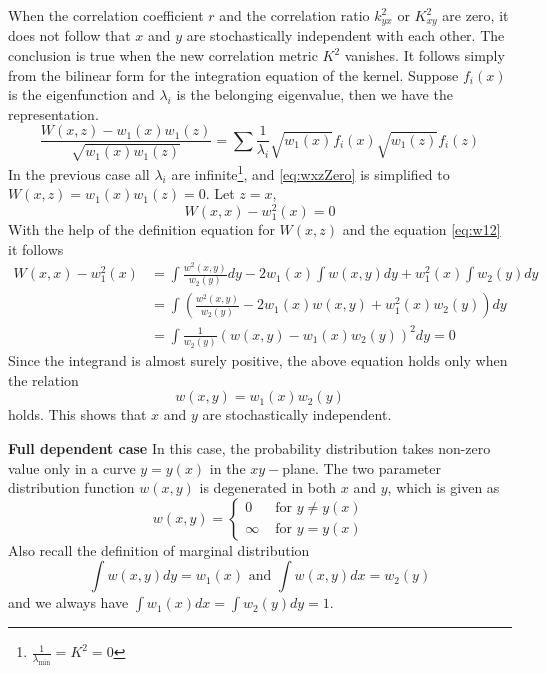 \documentclass{article}
\begin{document}
When the correlation coefficient $r$
and the correlation ratio $k^2_{yx}$ or $K^2_{xy}$
are zero, it does not follow that
$x$ and $y$ are stochastically independent with each other.
The conclusion is true when the new correlation metric $K^2$
vanishes. It follows simply from the bilinear form for the integration equation of the kernel. Suppose
$f_i(x)$ is the eigenfunction and $\lambda_i$
is the belonging eigenvalue,
then we have the representation.
\begin{equation}\label{eq:wxzZero}
    \frac{W(x,z) - w_1(x) w_1(z)}{\sqrt{w_1(x)w_1(z)}}
    = \sum \frac{1}{\lambda_i}
    \sqrt{w_1(x)}f_i(x) \sqrt{w_1(z)}f_i(z)
\end{equation}
In the previous case all $\lambda_i$ are infinite\footnote{$\frac{1}{\lambda_{\min}}=K^2=0$},
and \eqref{eq:wxzZero} is simplified to
$W(x,z)=w_1(x)w_1(z)=0$. Let $z=x$,
\begin{equation}
    W(x,x) - w_1^2(x) = 0
\end{equation}
With the help of the definition equation for $W(x,z)$
and the equation \eqref{eq:w12} it follows
\begin{align*}
    W(x,x) - w_1^2(x) &=
    \int \frac{w^2(x,y)}{w_2(y)}dy
    - 2 w_1(x) \int w(x,y)dy
    + w_1^2(x) \int w_2(y) dy \\
    &= \int \left(\frac{w^2(x,y)}{w_2(y)} - 2w_1(x)w(x,y) + w_1^2(x)w_2(y) \right) dy \\
    &= \int \frac{1}{w_2(y)}
    (w(x,y)-w_1(x)w_2(y))^2dy=0
\end{align*}
Since the integrand is almost surely positive, the above
equation holds only when the relation
$$w(x,y)=w_1(x)w_2(y)$$
holds. This shows that $x$
and $y$ are stochastically independent.

\textbf{Full dependent case}
In this case, the probability distribution takes
non-zero value 
only in a curve $y=y(x)$ in the $xy-$plane. The two
parameter distribution function $w(x,y)$ is degenerated
in both $x$ and $y$, which is given as
$$
w(x,y) = \begin{cases}
0 & \textrm{ for } y \neq y(x)\\
\infty &\textrm{ for } y = y(x)
\end{cases}
$$
Also recall the definition of marginal distribution
$$
\int w(x,y)dy = w_1(x) \textrm{ and } \int w(x,y)dx= w_2(y)
$$
and we always have $\int w_1(x)dx = \int w_2(y) dy = 1$.
\end{document}
